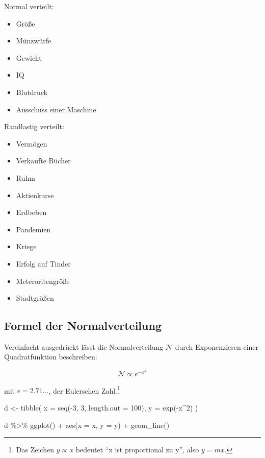 \documentclass[
  a4paper,
  DIV=11]{scrreprt}
\newenvironment{Shaded}{\begin{snugshade}}{\end{snugshade}}
\newcommand{\AttributeTok}[1]{\textcolor[rgb]{0.40,0.45,0.13}{#1}}
\newcommand{\DecValTok}[1]{\textcolor[rgb]{0.68,0.00,0.00}{#1}}
\newcommand{\FunctionTok}[1]{\textcolor[rgb]{0.28,0.35,0.67}{#1}}
\newcommand{\NormalTok}[1]{\textcolor[rgb]{0.00,0.23,0.31}{#1}}
\newcommand{\OtherTok}[1]{\textcolor[rgb]{0.00,0.23,0.31}{#1}}
\newcommand{\SpecialCharTok}[1]{\textcolor[rgb]{0.37,0.37,0.37}{#1}}
\providecommand{\tightlist}{%
  \setlength{\itemsep}{0pt}\setlength{\parskip}{0pt}}\usepackage{longtable,booktabs,array}
\theoremstyle{definition}
\theoremstyle{remark}
\begin{document}
Normal verteilt:

\begin{itemize}
\tightlist
\item
  Größe
\item
  Münzwürfe
\item
  Gewicht
\item
  IQ
\item
  Blutdruck
\item
  Ausschuss einer Maschine
\end{itemize}

Randlastig verteilt:

\begin{itemize}
\tightlist
\item
  Vermögen
\item
  Verkaufte Bücher
\item
  Ruhm
\item
  Aktienkurse
\item
  Erdbeben
\item
  Pandemien
\item
  Kriege
\item
  Erfolg auf Tinder
\item
  Meteroritengröße
\item
  Stadtgrößen
\end{itemize}

\hypertarget{formel-der-normalverteilung}{%
\subsection{Formel der
Normalverteilung}\label{formel-der-normalverteilung}}

Vereinfacht ausgedrückt lässt die Normalverteilung \(\mathcal{N}\) durch
Exponenzieren einer Quadratfunktion beschreiben:

\[\mathcal{N} \propto e^{-x^2}\]

mit \(e=2.71...\), der Eulerschen Zahl.\footnote{Das Zeichen
  \(y \propto x\) bedeutet ``x ist proportional zu y'', also \(y = mx\).}

\begin{Shaded}
\begin{Highlighting}[]
\NormalTok{d }\OtherTok{\textless{}{-}}
  \FunctionTok{tibble}\NormalTok{(}
    \AttributeTok{x =} \FunctionTok{seq}\NormalTok{(}\SpecialCharTok{{-}}\DecValTok{3}\NormalTok{, }\DecValTok{3}\NormalTok{, }
            \AttributeTok{length.out =} \DecValTok{100}\NormalTok{),}
    \AttributeTok{y =} \FunctionTok{exp}\NormalTok{(}\SpecialCharTok{{-}}\NormalTok{x}\SpecialCharTok{\^{}}\DecValTok{2}\NormalTok{)}
\NormalTok{  )}

\NormalTok{d }\SpecialCharTok{\%\textgreater{}\%} 
  \FunctionTok{ggplot}\NormalTok{() }\SpecialCharTok{+}
  \FunctionTok{aes}\NormalTok{(}\AttributeTok{x =}\NormalTok{ x, }\AttributeTok{y =}\NormalTok{ y) }\SpecialCharTok{+}
  \FunctionTok{geom\_line}\NormalTok{()}
\end{Highlighting}
\end{Shaded}
\end{document}
